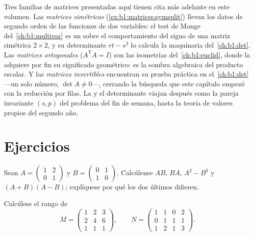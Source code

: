 \begin{remark}
\label{rem:b1:matrices:perspectives}
Tres familias de matrices presentadas aquí tienen cita más adelante
en este volumen. Las \emph{matrices simétricas}
(\cref{ex:b1:matrices:symsplit}) llevan los datos de segundo orden de
las funciones de dos variables: el test de Monge
del~\cref{ch:b1:multivar} es un  sobre el comportamiento del
signo de una matriz simétrica $2\times2$, y su determinante
$rt - s^2$ lo calcula la maquinaria del~\cref{ch:b1:det}. Las
\emph{matrices ortogonales} ($A^{\mathsf T}A = I$) son las isometrías
del~\cref{ch:b1:euclid}, donde la  adquiere por fin su
significado geométrico: es la sombra algebraica del producto escalar.
Y las \emph{matrices invertibles} encuentran su prueba práctica en
el~\cref{ch:b1:det} ---un solo número, $\det A \neq 0$---, cerrando
la búsqueda que este capítulo empezó con la reducción por filas. La
 y el determinante viajan después como la pareja invariante
$(s, p)$ del problema del fin de semana, hasta la teoría de valores
propios del segundo año.
\end{remark}

\section{Ejercicios}

\begin{exercise}[$\star$]\label{exo:b1:matrices:1}
Sean $A = \begin{pmatrix} 1 & 2 \\ 0 & 1 \end{pmatrix}$ y
$B = \begin{pmatrix} 0 & 1 \\ 1 & 0\end{pmatrix}$. Calcúlense $AB$,
$BA$, $A^2 - B^2$ y $(A+B)(A-B)$; explíquese por qué los dos últimos
difieren.
\end{exercise}

\begin{exercise}[$\star$]\label{exo:b1:matrices:2}
Calcúlese el rango de
\[
M = \begin{pmatrix}
1 & 2 & 3\\
2 & 4 & 6\\
1 & 1 & 1
\end{pmatrix},
\qquad
N = \begin{pmatrix}
1 & 1 & 0 & 2\\
0 & 1 & 1 & 1\\
1 & 2 & 1 & 3
\end{pmatrix}.
\]
\end{exercise}

